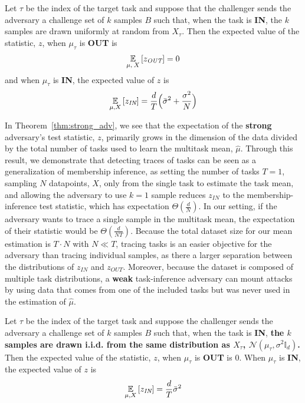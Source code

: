 \begin{thm}  \label{thm:strong_adv}

Let $\tau$ be the index of the target task and suppose that the challenger sends the adversary a challenge set of $k$ samples $B$ such that, when the task is \textbf{IN}, the $k$ samples are drawn uniformly at random from $X_\tau$. Then the expected value of the statistic, $z$, when $\mu_\tau$ is \textbf{OUT} is 
    \[
        \ex{\mu, \: X}{z_{\textit{OUT}}} = 0
    \]
    and when  $\mu_\tau$ is \textbf{IN}, the expected value of $z$ is
    \[
        \ex{\mu, X}{z_{\textit{IN}}} = \frac{d}{T} \Big( \bar{\sigma}^2 + \frac{\sigma^2}{N} \Big)
    \]
\end{thm} 






In Theorem~\ref{thm:strong_adv}, we see that the expectation of the \textbf{strong} adversary's test statistic, $z$, primarily grows in the dimension of the data divided by the total number of tasks used to learn the multitask mean, $\hat{\mu}$. Through this result, we demonstrate that detecting traces of tasks can be seen as a generalization of membership inference, as setting the number of tasks $T=1$, sampling $N$ datapoints, $X$, only from the single task to estimate the task mean, and allowing the adversary to use $k=1$ sample reduces $z_{IN}$ to the membership-inference test statistic, which has expectation $\Theta \left( \frac{d}{N} \right)$. In our setting, if the adversary wants to trace a single sample in the multitask mean, the expectation of their statistic would be $\Theta \left( \frac{d}{NT} \right)$. Because the total dataset size for our mean estimation is $T\cdot N$ with $N \ll T$, tracing tasks is an easier objective for the adversary than tracing individual samples, as there a larger separation between the distributions of $z_{IN}$ and $z_{OUT}$. Moreover, because the dataset is composed of multiple task distributions, a \textbf{weak} task-inference adversary can mount attacks by using data that comes from one of the included tasks but was never used in the estimation of $\hat{\mu}$.

\begin{thm} \label{thm:weak_adv}
    Let $\tau$ be the index of the target task and suppose the challenger sends the adversary a challenge set of $k$ samples $B$ such that, when the task is \textbf{IN}, \textbf{the $k$ samples are drawn i.i.d. from the same distribution as $X_\tau$, $\mathcal{N}(\mu_\tau, \sigma^2 \mathbb{I}_d)$.} Then the expected value of the statistic, $z$, when $\mu_\tau$ is \textbf{OUT} is 0. When $\mu_\tau$ is \textbf{IN}, the expected value of $z$ is 
    \[
        \ex{\mu, X}{z_{\textit{IN}}} = \frac{d}{T} \bar{\sigma}^2
    \]
\end{thm}

